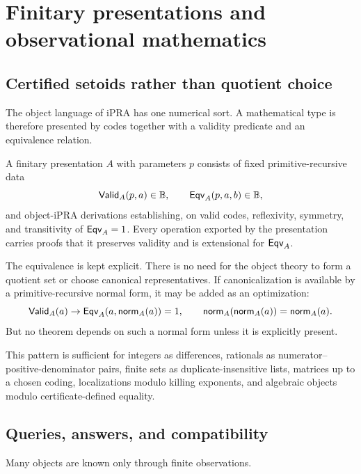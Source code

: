 
\section{Finitary presentations and observational mathematics}
\label{sec:presentations}

\subsection{Certified setoids rather than quotient choice}

The object language of iPRA has one numerical sort.  A mathematical type is
therefore presented by codes together with a validity predicate and an
equivalence relation.

\begin{definition}
A finitary presentation \(A\) with parameters \(p\) consists of fixed
primitive-recursive data
\[
  \mathsf{Valid}_A(p,a)\in\mathbb{B},\qquad
  \mathsf{Eqv}_A(p,a,b)\in\mathbb{B},
\]
and object-iPRA derivations establishing, on valid codes, reflexivity,
symmetry, and transitivity of \(\mathsf{Eqv}_A=1\).  Every operation exported by the
presentation carries proofs that it preserves validity and is extensional for
\(\mathsf{Eqv}_A\).
\end{definition}

The equivalence is kept explicit.  There is no need for the object theory to
form a quotient set or choose canonical representatives.  If canonicalization
is available by a primitive-recursive normal form, it may be added as an
optimization:
\[
   \mathsf{Valid}_A(a)\rightarrow
   \mathsf{Eqv}_A(a,\mathsf{norm}_A(a))=1,
   \qquad
   \mathsf{norm}_A(\mathsf{norm}_A(a))=\mathsf{norm}_A(a).
\]
But no theorem depends on such a normal form unless it is explicitly present.

This pattern is sufficient for integers as differences, rationals as
numerator--positive-denominator pairs, finite sets as duplicate-insensitive
lists, matrices up to a chosen coding, localizations modulo killing
exponents, and algebraic objects modulo certificate-defined equality.

\subsection{Queries, answers, and compatibility}

Many objects are known only through finite observations.

